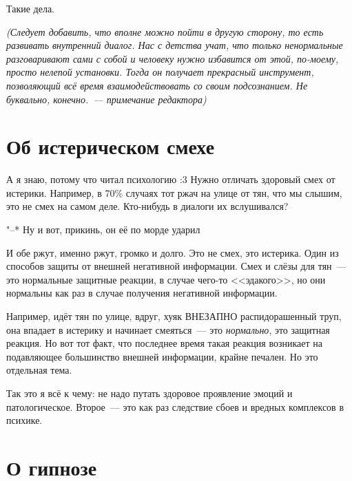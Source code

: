 \documentclass[a4paper,14pt,oneside]{memoir}
\begin{document}
Такие дела.

\smallskip

\textit{(Следует добавить, что вполне можно пойти в другую сторону, то есть развивать внутренний диалог. Нас с детства учат, что только ненормальные разговаривают сами с собой и человеку нужно избавится от этой, по-моему, просто нелепой установки. Тогда он получает прекрасный инструмент, позволяющий всё время взаимодействовать со своим подсознанием. Не буквально, конечно.~--- примечание редактора)}




\section{Об истерическом смехе}

\medskip
А я знаю, потому что читал психологию :3 Нужно отличать здоровый смех от истерики. Например, в 70\% случаях тот ржач на улице от тян, что мы слышим, это не смех на самом деле. Кто-нибудь в диалоги их вслушивался? 

"--* Ну и вот, прикинь, он её по морде ударил

И обе ржут, именно ржут, громко и долго. Это не смех, это истерика. Один из способов защиты от внешней негативной информации. Смех и слёзы для тян~--- это нормальные защитные реакции, в случае чего-то <<эдакого>>, но они нормальны как раз в случае получения негативной информации.

Например, идёт тян по улице, вдруг, хуяк ВНЕЗАПНО распидорашенный труп, она впадает в истерику и начинает смеяться~--- это \textit{нормально}, это защитная реакция. Но вот тот факт, что последнее время такая реакция возникает на подавляющее большинство внешней информации, крайне печален. Но это отдельная тема. 

Так это я всё к чему: не надо путать здоровое проявление эмоций и патологическое. Второе~--- это как раз следствие сбоев и вредных комплексов в психике. 




\section{О гипнозе}
\end{document}
